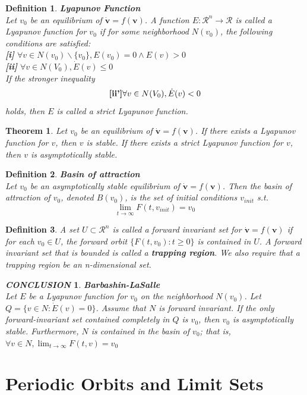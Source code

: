 \documentclass[12pt]{article}
\theoremstyle{plain}
\newtheorem{theorem}{\textbf{Theorem}}[section]
\newtheorem{definition}{{\color{red}\textbf{Definition}}}[section]
\newtheorem{conclusion}{\textit{\textbf{CONCLUSION}}}[section]
\begin{document}
\begin{definition}\textbf{Lyapunov Function}
\\\noindent Let $v_0$ be an equilibrium of $\dot {\mathbf v} = f(\mathbf v)$. A function $E : \mathcal R^n \rightarrow \mathcal R$ is called a Lyapunov function for $v_0$ if for some neighborhood $N(v_0)$, the following conditions are satisfied:
\\\noindent \textbf{[i]} $\forall v\in N(v_0) \backslash \{v_0\}, E(v_0) = 0 \land E(v) > 0$
\\\noindent \textbf{[ii]} $ \forall v \in N(V_0), \dot E(v) \leq 0$\\[1ex]
\noindent If the stronger inequality
$$
\textbf{[ii']} \forall v \in N(V_0), \dot E(v) < 0\\[1ex]
$$
holds, then $E$ is called a strict Lyapunov function.
\end{definition}



\begin{theorem} Let $v_0$ be an equilibrium of $\dot {\mathbf v} = f(\mathbf v)$. If there exists a Lyapunov function for $v$, then $v$ is stable. If there exists a strict Lyapunov function for $v$, then $v$ is asymptotically stable.
\end{theorem}



\begin{definition}\textbf{Basin of attraction}
\\\noindent Let $v_0$ be an asymptotically stable equilibrium of $\dot {\mathbf v} = f(\mathbf v)$. Then the basin of attraction of $v_0$, denoted $B(v_0)$, is the set of initial conditions $v_{init}$ s.t. 
$$
\lim_{t \rightarrow \infty} F(t, v_{init}) = v_0
$$
\end{definition}



\begin{definition}
A set $U\subset \mathcal R^n$ is called a forward invariant set for $\dot {\mathbf v} = f(\mathbf v)$ if for each $v_0 \in U$, the forward orbit $\{F(t, v_0) : t \geq 0\}$ is contained in $U$. A forward invariant set that is bounded is called a \textbf{trapping region}. We also require that a trapping region be an n-dimensional set.
\end{definition}



\begin{conclusion}\textbf{Barbashin-LaSalle}
\\\noindent Let $E$ be a Lyapunov function for $v_0$ on the neighborhood $N(v_0)$. Let $Q = \{v \in N: \dot E(v) = 0\}$. Assume that $N$ is forward invariant. If the only forward-invariant set contained completely in $Q$ is $v_0$, then $v_0$ is asymptotically stable. Furthermore, $N$ is contained in the basin of $v_0$; that is, $\forall v \in N, \lim_{t \rightarrow \infty}F(t, v) = v_0$
\end{conclusion}







\newpage
\section{Periodic Orbits and Limit Sets}

\newpage


\end{document}
